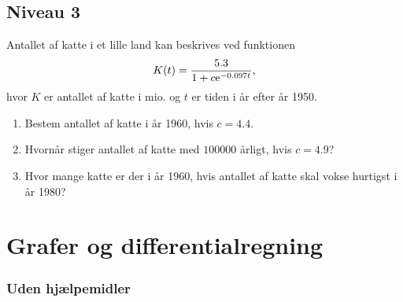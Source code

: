 \subsection*{Niveau 3}
Antallet af katte i et lille land kan beskrives ved funktionen 
\begin{align*}
	K(t) = \frac{5.3}{1+c\textnormal{e}^{-0.097t}},
\end{align*}
hvor $K$ er antallet af katte i mio. og $t$ er tiden i år efter år 1950.

\begin{enumerate}[label=\roman*)]
	\item Bestem antallet af katte i år 1960, hvis $c = 4.4$.
	\item Hvornår stiger antallet af katte med $100000$ årligt, hvis $c = 4.9$?
	\item Hvor mange katte er der i år 1960, hvis antallet af katte skal vokse hurtigst i år 1980?
\end{enumerate}

\newpage
\section*{Grafer og differentialregning}

\subsubsection*{Uden hjælpemidler}

